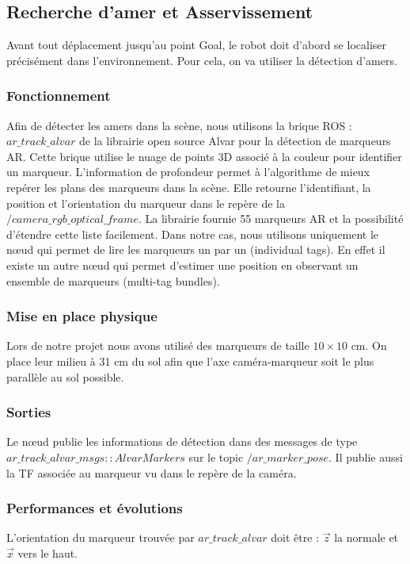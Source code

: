 \documentclass[10pt,a4paper]{article}
\begin{document}
\subsection{Recherche d'amer et Asservissement}
\label{sec:recherche}

Avant tout déplacement jusqu'au point Goal, le robot doit d'abord se localiser précisément dans l'environnement. Pour cela, on va utiliser la détection d'amers.

\subsubsection{Fonctionnement}
Afin de détecter les amers dans la scène, nous utilisons la brique ROS : $ar\_track\_alvar$ de la librairie open source Alvar pour la détection de marqueurs AR.
Cette brique utilise le nuage de points 3D associé à la couleur pour identifier un marqueur. L'information de profondeur permet à l'algorithme de mieux repérer les plans des marqueurs dans la scène. Elle retourne l'identifiant, la position et l'orientation du marqueur dans le repère de la $/camera\_rgb\_optical\_frame$. La librairie fournie 55 marqueurs AR et la possibilité d'étendre cette liste facilement. Dans notre cas, nous utilisons uniquement le nœud qui permet de lire les marqueurs un par un (individual tags). En effet il existe un autre nœud qui permet d'estimer une position en observant un ensemble de marqueurs (multi-tag bundles).

\subsubsection{Mise en place physique} 
Lors de notre projet nous avons utilisé des marqueurs de taille $10 \times 10$ cm. On place leur milieu à 31 cm du sol afin que l'axe caméra-marqueur soit le plus parallèle au sol possible.

\subsubsection{Sorties}
Le nœud publie les informations de détection dans des messages de type $ar\_track\_alvar\_msgs::AlvarMarkers$ sur le topic $/ar\_marker\_pose$. Il publie aussi la TF associée au marqueur vu dans le repère de la caméra.
	
\subsubsection{Performances et évolutions}
L'orientation du marqueur trouvée par $ar\_track\_alvar$ doit être : $\vec{z}$ la normale et $\vec{x}$ vers le haut.
	
\end{document}

